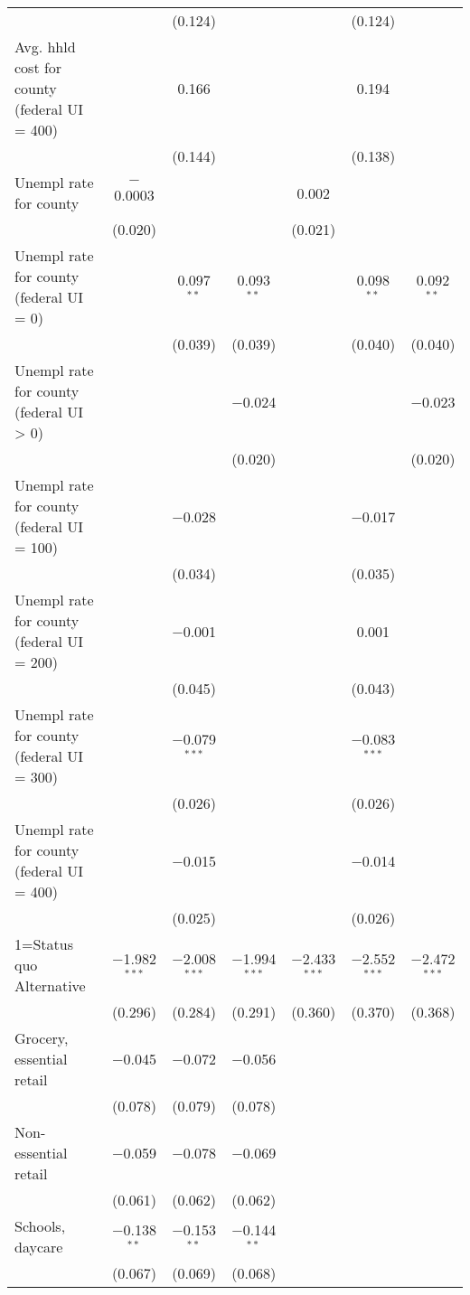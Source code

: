 \begin{table}[!htbp]
\begin{tabular}{@{\extracolsep{5pt}}lcccccc}
  &  & (0.124) &  &  & (0.124) &  \\ 
  Avg. hhld cost for county (federal UI = 400) &  & 0.166 &  &  & 0.194 &  \\ 
  &  & (0.144) &  &  & (0.138) &  \\ 
  Unempl rate for county & $-$0.0003 &  &  & 0.002 &  &  \\ 
  & (0.020) &  &  & (0.021) &  &  \\ 
  Unempl rate for county (federal UI = 0) &  & 0.097$^{**}$ & 0.093$^{**}$ &  & 0.098$^{**}$ & 0.092$^{**}$ \\ 
  &  & (0.039) & (0.039) &  & (0.040) & (0.040) \\ 
  Unempl rate for county (federal UI > 0) &  &  & $-$0.024 &  &  & $-$0.023 \\ 
  &  &  & (0.020) &  &  & (0.020) \\ 
  Unempl rate for county (federal UI = 100) &  & $-$0.028 &  &  & $-$0.017 &  \\ 
  &  & (0.034) &  &  & (0.035) &  \\ 
  Unempl rate for county (federal UI = 200) &  & $-$0.001 &  &  & 0.001 &  \\ 
  &  & (0.045) &  &  & (0.043) &  \\ 
  Unempl rate for county (federal UI = 300) &  & $-$0.079$^{***}$ &  &  & $-$0.083$^{***}$ &  \\ 
  &  & (0.026) &  &  & (0.026) &  \\ 
  Unempl rate for county (federal UI = 400) &  & $-$0.015 &  &  & $-$0.014 &  \\ 
  &  & (0.025) &  &  & (0.026) &  \\ 
  1=Status quo Alternative & $-$1.982$^{***}$ & $-$2.008$^{***}$ & $-$1.994$^{***}$ & $-$2.433$^{***}$ & $-$2.552$^{***}$ & $-$2.472$^{***}$ \\ 
  & (0.296) & (0.284) & (0.291) & (0.360) & (0.370) & (0.368) \\ 
  Grocery, essential retail & $-$0.045 & $-$0.072 & $-$0.056 &  &  &  \\ 
  & (0.078) & (0.079) & (0.078) &  &  &  \\ 
  Non-essential retail & $-$0.059 & $-$0.078 & $-$0.069 &  &  &  \\ 
  & (0.061) & (0.062) & (0.062) &  &  &  \\ 
  Schools, daycare & $-$0.138$^{**}$ & $-$0.153$^{**}$ & $-$0.144$^{**}$ &  &  &  \\ 
  & (0.067) & (0.069) & (0.068) &  &  &  \\ 

\end{tabular}
\end{table}
